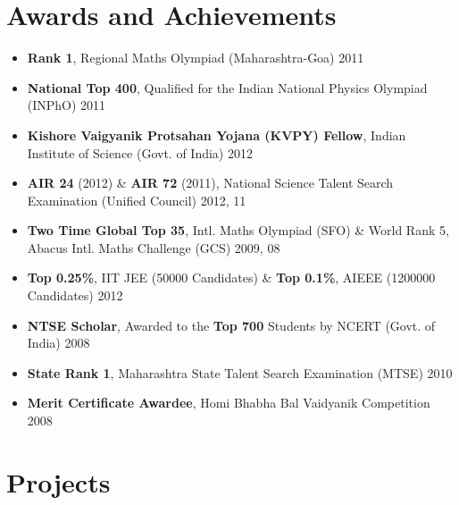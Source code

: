 \documentclass[a4paper]{article} %
\newcommand{\bulletspace}{0.7cm}
\begin{document}
\section{Awards and Achievements}

 \begin{itemize}[leftmargin=\bulletspace{}]
            \item \noindent \textbf{Rank 1}, Regional Maths Olympiad (Maharashtra-Goa) \hfill 2011
            \item  \noindent \textbf{National Top 400}, Qualified for the Indian National Physics Olympiad (INPhO) \hfill 2011
            \item \noindent \textbf{Kishore Vaigyanik Protsahan Yojana (KVPY) Fellow}, Indian Institute of Science (Govt. of India) \hfill 2012
            \item \noindent \textbf{AIR 24} (2012) \& \textbf{AIR 72} (2011), National Science Talent Search Examination (Unified Council) \hfill 2012, 11
            \item \noindent \textbf{Two Time Global Top 35}, Intl. Maths Olympiad (SFO) \& World Rank 5, Abacus Intl. Maths Challenge (GCS) \hfill 2009, 08
            \item \noindent \textbf{Top 0.25\%}, IIT JEE (50000 Candidates) \& \textbf{Top 0.1\%}, AIEEE (1200000 Candidates) \hfill 2012
            \item \noindent \textbf{NTSE Scholar}, Awarded to the \textbf{Top 700} Students by NCERT (Govt. of India) \hfill 2008
            \item \noindent \textbf{State Rank 1}, Maharashtra State Talent Search Examination (MTSE) \hfill 2010
            \item \noindent \textbf{Merit Certificate Awardee}, Homi Bhabha Bal Vaidyanik Competition \hfill 2008\\
         \end{itemize}




\section{Projects}
\end{document}
